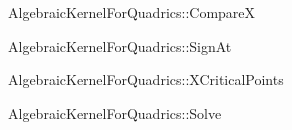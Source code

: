 
\begin{ccRefFunctionObjectConcept}{AlgebraicKernelForQuadrics::CompareX}

\end{ccRefFunctionObjectConcept}


\begin{ccRefFunctionObjectConcept}{AlgebraicKernelForQuadrics::SignAt}

\end{ccRefFunctionObjectConcept}


\begin{ccRefFunctionObjectConcept}{AlgebraicKernelForQuadrics::XCriticalPoints}

\end{ccRefFunctionObjectConcept}


\begin{ccRefFunctionObjectConcept}{AlgebraicKernelForQuadrics::Solve}

\end{ccRefFunctionObjectConcept}
